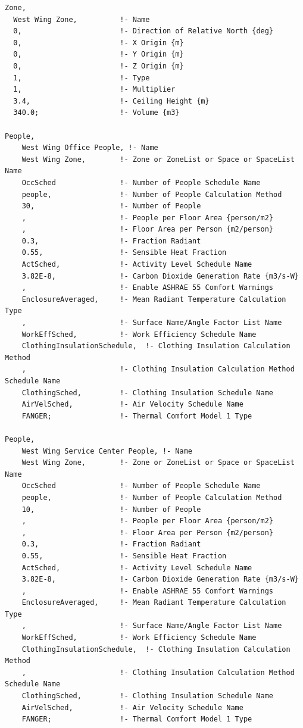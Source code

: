 \begin{lstlisting}
Zone,
  West Wing Zone,          !- Name
  0,                       !- Direction of Relative North {deg}
  0,                       !- X Origin {m}
  0,                       !- Y Origin {m}
  0,                       !- Z Origin {m}
  1,                       !- Type
  1,                       !- Multiplier
  3.4,                     !- Ceiling Height {m}
  340.0;                   !- Volume {m3}
  
People,
    West Wing Office People, !- Name
    West Wing Zone,        !- Zone or ZoneList or Space or SpaceList Name
    OccSched               !- Number of People Schedule Name
    people,                !- Number of People Calculation Method
    30,                    !- Number of People
    ,                      !- People per Floor Area {person/m2}
    ,                      !- Floor Area per Person {m2/person}
    0.3,                   !- Fraction Radiant
    0.55,                  !- Sensible Heat Fraction
    ActSched,              !- Activity Level Schedule Name
    3.82E-8,               !- Carbon Dioxide Generation Rate {m3/s-W}
    ,                      !- Enable ASHRAE 55 Comfort Warnings
    EnclosureAveraged,     !- Mean Radiant Temperature Calculation Type
    ,                      !- Surface Name/Angle Factor List Name
    WorkEffSched,          !- Work Efficiency Schedule Name
    ClothingInsulationSchedule,  !- Clothing Insulation Calculation Method
    ,                      !- Clothing Insulation Calculation Method Schedule Name
    ClothingSched,         !- Clothing Insulation Schedule Name
    AirVelSched,           !- Air Velocity Schedule Name
    FANGER;                !- Thermal Comfort Model 1 Type

People,
    West Wing Service Center People, !- Name
    West Wing Zone,        !- Zone or ZoneList or Space or SpaceList Name
    OccSched               !- Number of People Schedule Name
    people,                !- Number of People Calculation Method
    10,                    !- Number of People
    ,                      !- People per Floor Area {person/m2}
    ,                      !- Floor Area per Person {m2/person}
    0.3,                   !- Fraction Radiant
    0.55,                  !- Sensible Heat Fraction
    ActSched,              !- Activity Level Schedule Name
    3.82E-8,               !- Carbon Dioxide Generation Rate {m3/s-W}
    ,                      !- Enable ASHRAE 55 Comfort Warnings
    EnclosureAveraged,     !- Mean Radiant Temperature Calculation Type
    ,                      !- Surface Name/Angle Factor List Name
    WorkEffSched,          !- Work Efficiency Schedule Name
    ClothingInsulationSchedule,  !- Clothing Insulation Calculation Method
    ,                      !- Clothing Insulation Calculation Method Schedule Name
    ClothingSched,         !- Clothing Insulation Schedule Name
    AirVelSched,           !- Air Velocity Schedule Name
    FANGER;                !- Thermal Comfort Model 1 Type


\end{lstlisting}
